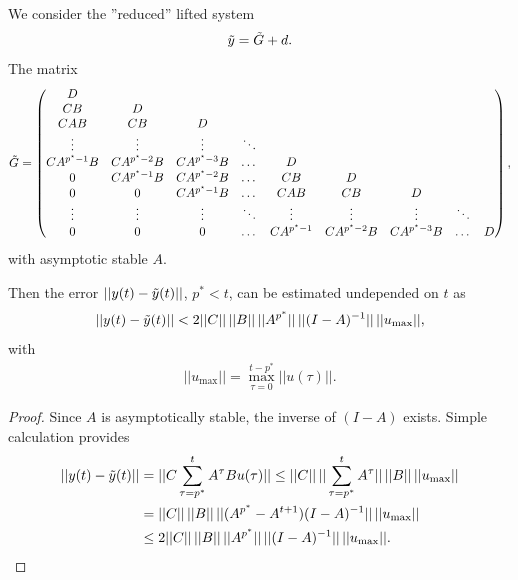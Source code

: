 	\begin{theo}
		\label{thm:Appl:redSys}
	We consider the ''reduced'' lifted system 
	\begin{align}
	\tilde{y} = \tilde{G} + d.
	\end{align}
	The matrix 
	\begin{align}
	\tilde{G} = \begin{pmatrix}
	D  \\
	CB & D \\
	C A B & CB & D\\
	\vdots & \vdots & \vdots & \ddots \\
	C A^{p^\star-1} B & C A^{p^\star-2}B & C A^{p^\star-3}B &\dots& D \\
	0           & C A^{p^\star-1} B & C A^{p^\star-2} B & \dots & CB & D\\
	0 & 0 & C A^{p^\star-1} B & \dots & CAB & CB & D \\
	\vdots & \vdots & \vdots & \ddots & \vdots & \vdots & \vdots & \ddots \\
	0 & 0 & 0 & \dots & C A^{p^\star-1}& C A^{p^\star-2}B& CA^{p^\star-3}B &\dots & D
	\end{pmatrix},
	\end{align}
	with asymptotic stable $A$.
	
	Then the error $||y(t) - \tilde{y}(t)||$, $p^* < t$, can be estimated undepended on $t$ as 
	\begin{align}
	||y(t) - \tilde{y}(t)|| < 2 ||C|| \, ||B|| \,  ||A^{p^*}||\, ||(I - A)^{-1}||\,||u_{\max}||, 
	\end{align}
	with 
	\begin{align}
	||u_{\max}|| = \max_{\tau = 0}^{t - p^*} ||u(\tau)||. 
	\end{align}

	\end{theo}	
	\begin{proof}
	Since $A$ is asymptotically stable, the inverse of $(I - A)$ exists. Simple calculation provides 
		\begin{align}
	\begin{split}
			||y(t) - \tilde{y}(t)|| &= ||C \sum_{\tau = p^*}^t A^\tau B u(\tau)|| \leq ||C|| \, ||\sum_{\tau = p^*}^t A^\tau || \,||B|| \, ||u_{\max}|| \\
			& = ||C|| \, ||B|| \, ||(A^{p^*} - A^{t + 1})(I - A)^{-1}|| \, ||u_{\max}|| \\
			&  \leq 2 ||C|| \, ||B|| \, ||A^{p^*}|| \, ||(I - A)^{-1}|| \, ||u_{\max}||. 
	\end{split}
		\end{align}
	\end{proof}

